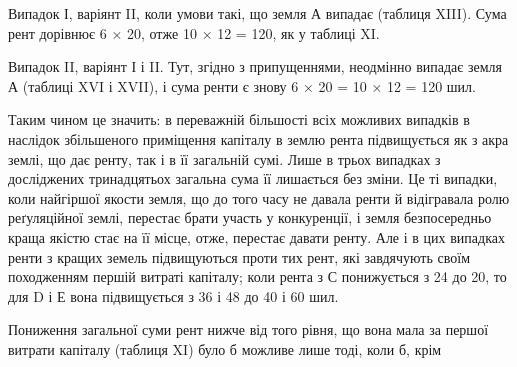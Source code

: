 Випадок І, варіянт II, коли умови такі, що земля А випадає (таблиця XIII).
Сума рент дорівнює 6 × 20, отже 10 × 12 = 120, як у таблиці XI.

Випадок II, варіянт І і II. Тут, згідно з припущеннями, неодмінно випадає
земля А (таблиці XVI і XVII), і сума ренти є знову 6 × 20 = 10 × 12 =
120 шил.

Таким чином це значить: в переважній більшості всіх можливих випадків
в наслідок збільшеного приміщення капіталу в землю рента підвищується як
з акра землі, що дає ренту, так і в її загальній сумі. Лише в трьох випадках
з досліджених тринадцятьох загальна сума її лишається без зміни. Це ті випадки,
коли найгіршої якости земля, що до того часу не давала ренти й відігравала
ролю реґуляційної землі, перестає брати участь у конкуренції, і земля безпосередньо
краща якістю стає на її місце, отже, перестає давати ренту. Але і в
цих випадках ренти з кращих земель підвищуються проти тих рент, які завдячують
своїм походженням першій витраті капіталу; коли рента з С понижується
з 24 до 20, то для D і Е вона підвищується з 36 і 48 до 40 і 60 шил.

Пониження загальної суми рент нижче від того рівня, що вона мала за
першої витрати капіталу (таблиця XI) було б можливе лише тоді, коли б, крім
\parbreak{}  %
